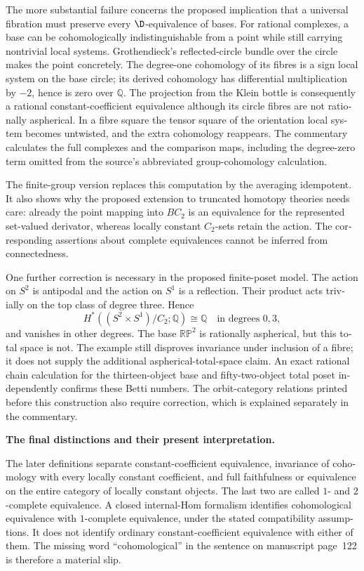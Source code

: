\begin{otherlanguage}{english}
The more substantial failure concerns the proposed implication that a universal fibration must preserve every $\D$-equivalence of bases. For rational complexes, a base can be cohomologically indistinguishable from a point while still carrying nontrivial local systems. Grothendieck's reflected-circle bundle over the circle makes the point concretely. The degree-one cohomology of its fibres is a sign local system on the base circle; its derived cohomology has differential multiplication by $-2$, hence is zero over $\mathbb Q$. The projection from the Klein bottle is consequently a rational constant-coefficient equivalence although its circle fibres are not rationally aspherical. In a fibre square the tensor square of the orientation local system becomes untwisted, and the extra cohomology reappears. The commentary calculates the full complexes and the comparison maps, including the degree-zero term omitted from the source's abbreviated group-cohomology calculation.

The finite-group version replaces this computation by the averaging idempotent. It also shows why the proposed extension to truncated homotopy theories needs care: already the point mapping into $BC_2$ is an equivalence for the represented set-valued derivator, whereas locally constant $C_2$-sets retain the action. The corresponding assertions about complete equivalences cannot be inferred from connectedness.

One further correction is necessary in the proposed finite-poset model. The action on $S^2$ is antipodal and the action on $S^1$ is a reflection. Their product acts trivially on the top class of degree three. Hence
\[
 H^*((S^2\times S^1)/C_2;\mathbb Q)
 \cong\mathbb Q\quad\text{in degrees }0,3,
\]
and vanishes in other degrees. The base $\mathbb{RP}^2$ is rationally aspherical, but this total space is not. The example still disproves invariance under inclusion of a fibre; it does not supply the additional aspherical-total-space claim. An exact rational chain calculation for the thirteen-object base and fifty-two-object total poset independently confirms these Betti numbers. The orbit-category relations printed before this construction also require correction, which is explained separately in the commentary.

\medskip\noindent\textbf{The final distinctions and their present interpretation.}

The later definitions separate constant-coefficient equivalence, invariance of cohomology with every locally constant coefficient, and full faithfulness or equivalence on the entire category of locally constant objects. The last two are called $1$- and $2$-complete equivalence. A closed internal-Hom formalism identifies cohomological equivalence with $1$-complete equivalence, under the stated compatibility assumptions. It does not identify ordinary constant-coefficient equivalence with either of them. The missing word ``cohomological'' in the sentence on manuscript page~122 is therefore a material slip.


\end{otherlanguage}
